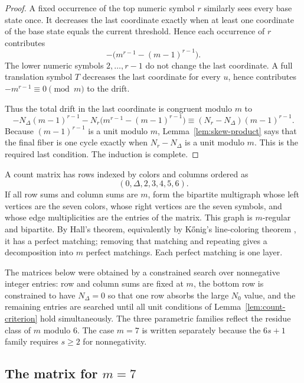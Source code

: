 \documentclass[11pt]{article}
\theoremstyle{definition}
\begin{document}
\begin{proof}
A fixed occurrence of the top numeric symbol \(r\) similarly sees every base state once.  It decreases the last coordinate exactly when at least one coordinate of the base state equals the current threshold.  Hence each occurrence of \(r\) contributes
\[
-\bigl(m^{r-1}-(m-1)^{r-1}\bigr).
\]
The lower numeric symbols \(2,\ldots,r-1\) do not change the last coordinate.  A full translation symbol \(T\) decreases the last coordinate for every \(u\), hence contributes \(-m^{r-1}\equiv0\pmod m\) to the drift.

Thus the total drift in the last coordinate is congruent modulo \(m\) to
\[
-N_\Delta(m-1)^{r-1}-N_r\bigl(m^{r-1}-(m-1)^{r-1}\bigr)
\equiv (N_r-N_\Delta)(m-1)^{r-1}.
\]
Because \((m-1)^{r-1}\) is a unit modulo \(m\), Lemma~\ref{lem:skew-product} says that the final
fiber is one cycle exactly when \(N_r-N_\Delta\) is a unit modulo \(m\).  This is the required last
condition.  The induction is complete.
\end{proof}

A count matrix has rows indexed by colors and columns ordered as
\[
(0,\Delta,2,3,4,5,6).
\]
If all row sums and column sums are \(m\), form the bipartite multigraph whose left vertices are the seven colors, whose right vertices are the seven symbols, and whose edge multiplicities are the entries of the matrix.  This graph is \(m\)-regular and bipartite.  By Hall's theorem, equivalently by K\H{o}nig's line-coloring theorem \cite{Konig}, it has a perfect matching; removing that matching and repeating gives a decomposition into \(m\) perfect matchings.  Each perfect matching is one layer.

The matrices below were obtained by a constrained search over nonnegative integer entries: row and column sums are fixed at \(m\), the bottom row is constrained to have \(N_\Delta=0\) so that one row absorbs the large \(N_0\) value, and the remaining entries are searched until all unit conditions of Lemma~\ref{lem:count-criterion} hold simultaneously.  The three parametric families reflect the residue class of \(m\) modulo \(6\).  The case \(m=7\) is written separately because the \(6s+1\) family requires \(s\ge2\) for nonnegativity.

\subsection{The matrix for \texorpdfstring{\(m=7\)}{m=7}}
\end{document}
